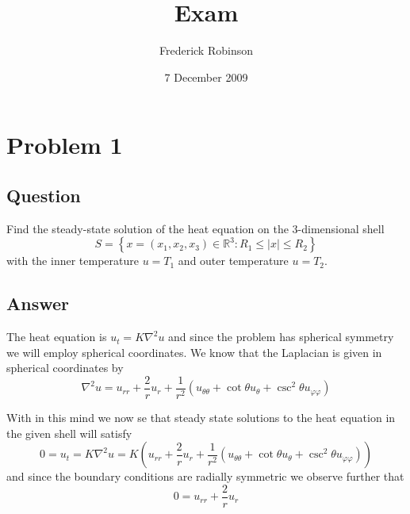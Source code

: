 \documentclass[12pt]{article}
\title{Exam}
\author{Frederick Robinson}
\date{7 December 2009}
\begin{document}
   \maketitle

\setcounter{tocdepth}{1} 

\tableofcontents

\section{Problem 1}
\subsection{Question}
Find the steady-state solution of the heat equation on the 3-dimensional shell
\[S=\left\{ x=(x_1,x_2,x_3)\in\mathbb{R}^3:R_1\leq |x| \leq R_2 \right\}\]
with the inner temperature $u=T_1$ and outer temperature $u=T_2$.

\subsection{Answer}\label{1::}
The heat equation is $u_t = K \nabla ^2 u$  and since the problem has spherical symmetry we will employ spherical coordinates. We know that \cite[Page 237]{pinsky} the Laplacian is given in spherical coordinates by
\[\nabla^2 u = u_{rr} +\frac{2}{r} u_r+ \frac{1}{r^2} \left( u_{\theta \theta} +\cot{\theta} u_\theta  +  \csc^2{\theta} u_{\varphi \varphi} \right)\]

With in this mind we now se that steady state solutions to the heat equation in the given shell will satisfy 
\[0=u_t=K \nabla^2 u = K \left( u_{rr} +\frac{2}{r} u_r+ \frac{1}{r^2} \left( u_{\theta \theta} +\cot{\theta} u_\theta  +  \csc^2{\theta} u_{\varphi \varphi} \right) \right) \]
and since the boundary conditions are radially symmetric we observe further that 
\[0=  u_{rr} +\frac{2}{r} u_r \]
\end{document}
